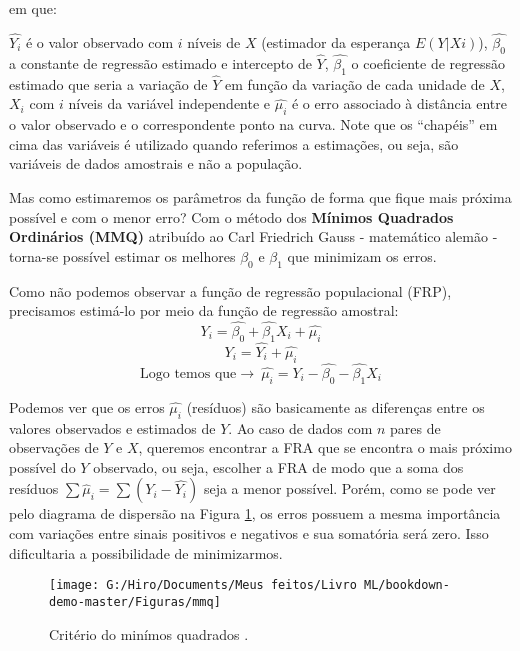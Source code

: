 \documentclass[
  openany]{book}
\begin{document}
em que:

\(\hat{Y_i}\) é o valor observado com \(i\) níveis de \(X\) (estimador da esperança \(E(Y|Xi)\)), \(\hat{\beta_0}\) a constante de regressão estimado e intercepto de \(\hat{Y}\), \(\hat{\beta_1}\) o coeficiente de regressão estimado que seria a variação de \(\hat{Y}\) em função da variação de cada unidade de \(X\), \(X_i\) com \(i\) níveis da variável independente e \(\hat{\mu_i}\) é o erro associado à distância entre o valor observado e o correspondente ponto na curva. Note que os ``chapéis'' em cima das variáveis é utilizado quando referimos a estimações, ou seja, são variáveis de dados amostrais e não a população.

Mas como estimaremos os parâmetros da função de forma que fique mais próxima possível e com o menor erro? Com o método dos \textbf{Mínimos Quadrados Ordinários (MMQ)} atribuído ao Carl Friedrich Gauss - matemático alemão - torna-se possível estimar os melhores \(\beta_0\) e \(\beta_1\) que minimizam os erros.

Como não podemos observar a função de regressão populacional (FRP), precisamos estimá-lo por meio da função de regressão amostral:
\[Y_i=\hat{\beta_0}+\hat{\beta_1}X_i+\hat{\mu_i} \]
\[Y_i=\hat{Y_i}+\hat{\mu_i}\]
\[\mbox{Logo temos que} \rightarrow \ \hat{\mu_i}=Y_i-\hat{\beta_0}-\hat{\beta_1} X_i\]

Podemos ver que os erros \(\hat{\mu_i}\) (resíduos) são basicamente as diferenças entre os valores observados e estimados de \(Y\). Ao caso de dados com \(n\) pares de observações de \(Y\) e \(X\), queremos encontrar a FRA que se encontra o mais próximo possível do \(Y\) observado, ou seja, escolher a
FRA de modo que a soma dos resíduos \(\sum \hat{\mu}_i=\sum(Y_i-\hat{Y_i})\) seja a menor possível. Porém, como se pode ver pelo diagrama de dispersão na Figura \ref{fig:mmq}, os erros possuem a mesma importância com variações entre sinais positivos e negativos e sua somatória será zero. Isso dificultaria a possibilidade de minimizarmos.

\begin{figure}

{\centering \texttt{[image: G:/Hiro/Documents/Meus feitos/Livro ML/bookdown-demo-master/Figuras/mmq]} 

}

\caption{Critério do minímos quadrados \citet{gujarati2011econometria}.}\label{fig:mmq}
\end{figure}
\end{document}
